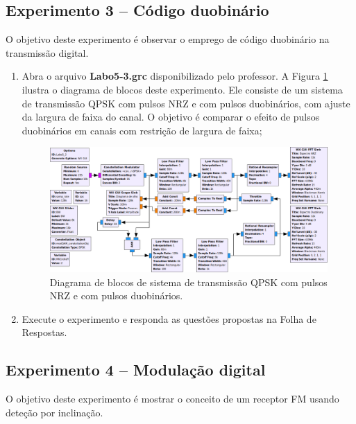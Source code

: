 \documentclass[12pt,addpoints]{exam}
\begin{document}
\subsection{Experimento 3 -- Código duobinário}

O objetivo deste experimento é observar o emprego de código duobinário na transmissão digital.
\begin{enumerate}
    \item Abra o arquivo \textbf{Labo5-3.grc} disponibilizado pelo professor. A Figura \ref{fig:GRC_5-3} ilustra o diagrama de blocos deste experimento. Ele consiste de um sistema de transmissão QPSK com pulsos NRZ e com pulsos duobinários, com ajuste da largura de faixa do canal. O objetivo é comparar o efeito de pulsos duobinários em canais com restrição de largura de faixa;
    \begin{figure}[htb]
        \centering
        \includegraphics[width=\textwidth]{Figuras/Labo5-3}
        \caption{Diagrama de blocos de sistema de transmissão QPSK com pulsos NRZ e com pulsos duobinários.} 
        \label{fig:GRC_5-3}
    \end{figure}
  \item Execute o experimento e responda as questões propostas na Folha de Respostas.
\end{enumerate}

\subsection{Experimento 4 -- Modulação digital}

O objetivo deste experimento é mostrar o conceito de um receptor FM usando deteção por inclinação.
\end{document}
